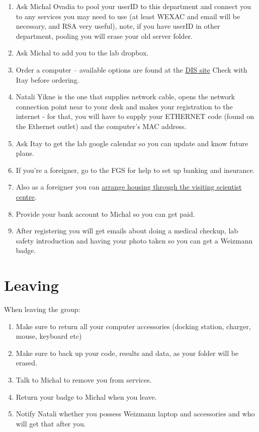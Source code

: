 \documentclass[]{book}
\providecommand{\tightlist}{%
  \setlength{\itemsep}{0pt}\setlength{\parskip}{0pt}}
\begin{document}
\begin{enumerate}
\def\labelenumi{\arabic{enumi}.}
\tightlist
\item
  Ask Michal Ovadia to pool your userID to this department and connect
  you to any services you may need to use (at least WEXAC and email will
  be necessary, and RSA very useful), note, if you have userID in other
  department, pooling you will erase your old server folder.
\item
  Ask Michal to add you to the lab dropbox.
\item
  Order a computer -- available options are found at the
  \href{http://www.weizmann.ac.il/DIS/computing-hardware/pc/windows-laptops}{DIS
  site} Check with Itay before ordering.
\item
  Natali Yikne is the one that supplies network cable, opens the network
  connection point near to your desk and makes your registration to the
  internet - for that, you will have to supply your ETHERNET code (found
  on the Ethernet outlet) and the computer's MAC address.
\item
  Ask Itay to get the lab google calendar so you can update and know
  future plans.
\item
  If you're a foreigner, go to the FGS for help to set up banking and
  insurance.
\item
  Also as a foreigner you can
  \href{http://www.weizmann.ac.il/vs/}{arrange housing through the
  visiting scientist centre}.
\item
  Provide your bank account to Michal so you can get paid.
\item
  After registering you will get emails about doing a medical checkup,
  lab safety introduction and having your photo taken so you can get a
  Weizmann badge.
\end{enumerate}

\section{Leaving}\label{leaving}

When leaving the group:

\begin{enumerate}
\def\labelenumi{\arabic{enumi}.}
\tightlist
\item
  Make sure to return all your computer accessories (docking station,
  charger, mouse, keyboard etc)
\item
  Make sure to back up your code, results and data, as your folder will
  be erased.
\item
  Talk to Michal to remove you from services.
\item
  Return your badge to Michal when you leave.
\item
  Notify Natali whether you possess Weizmann laptop and accessories and
  who will get that after you.
\end{enumerate}
\end{document}
